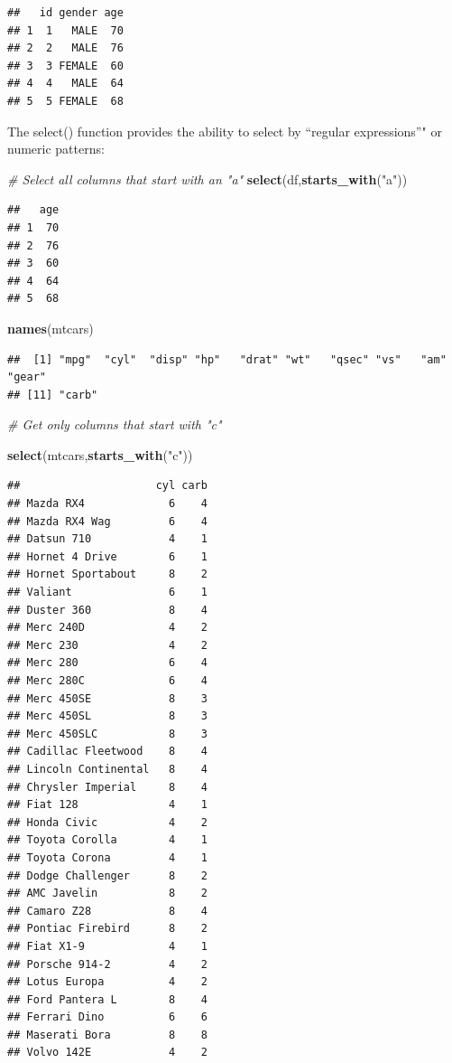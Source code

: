 \documentclass[]{book}
\newenvironment{Shaded}{\begin{snugshade}}{\end{snugshade}}
\newcommand{\CommentTok}[1]{\textcolor[rgb]{0.56,0.35,0.01}{\textit{#1}}}
\newcommand{\KeywordTok}[1]{\textcolor[rgb]{0.13,0.29,0.53}{\textbf{#1}}}
\newcommand{\NormalTok}[1]{#1}
\newcommand{\StringTok}[1]{\textcolor[rgb]{0.31,0.60,0.02}{#1}}
\begin{document}
\begin{verbatim}
##   id gender age
## 1  1   MALE  70
## 2  2   MALE  76
## 3  3 FEMALE  60
## 4  4   MALE  64
## 5  5 FEMALE  68
\end{verbatim}

The select() function provides the ability to select by ``regular expressions''" or numeric patterns:

\begin{Shaded}
\begin{Highlighting}[]
\CommentTok{# Select all columns that start with an "a"}
\KeywordTok{select}\NormalTok{(df,}\KeywordTok{starts_with}\NormalTok{(}\StringTok{"a"}\NormalTok{))}
\end{Highlighting}
\end{Shaded}

\begin{verbatim}
##   age
## 1  70
## 2  76
## 3  60
## 4  64
## 5  68
\end{verbatim}

\begin{Shaded}
\begin{Highlighting}[]
\KeywordTok{names}\NormalTok{(mtcars)}
\end{Highlighting}
\end{Shaded}

\begin{verbatim}
##  [1] "mpg"  "cyl"  "disp" "hp"   "drat" "wt"   "qsec" "vs"   "am"   "gear"
## [11] "carb"
\end{verbatim}

\begin{Shaded}
\begin{Highlighting}[]
\CommentTok{# Get only columns that start with "c"}

\KeywordTok{select}\NormalTok{(mtcars,}\KeywordTok{starts_with}\NormalTok{(}\StringTok{"c"}\NormalTok{))}
\end{Highlighting}
\end{Shaded}

\begin{verbatim}
##                     cyl carb
## Mazda RX4             6    4
## Mazda RX4 Wag         6    4
## Datsun 710            4    1
## Hornet 4 Drive        6    1
## Hornet Sportabout     8    2
## Valiant               6    1
## Duster 360            8    4
## Merc 240D             4    2
## Merc 230              4    2
## Merc 280              6    4
## Merc 280C             6    4
## Merc 450SE            8    3
## Merc 450SL            8    3
## Merc 450SLC           8    3
## Cadillac Fleetwood    8    4
## Lincoln Continental   8    4
## Chrysler Imperial     8    4
## Fiat 128              4    1
## Honda Civic           4    2
## Toyota Corolla        4    1
## Toyota Corona         4    1
## Dodge Challenger      8    2
## AMC Javelin           8    2
## Camaro Z28            8    4
## Pontiac Firebird      8    2
## Fiat X1-9             4    1
## Porsche 914-2         4    2
## Lotus Europa          4    2
## Ford Pantera L        8    4
## Ferrari Dino          6    6
## Maserati Bora         8    8
## Volvo 142E            4    2
\end{verbatim}
\end{document}
